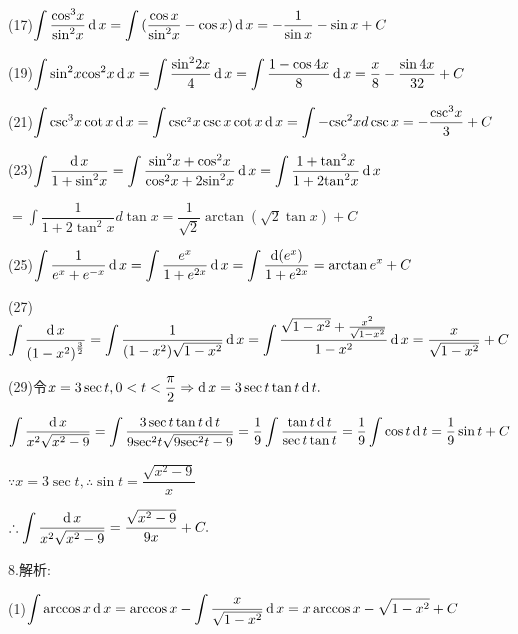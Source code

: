 (17)$\displaystyle\int {\dfrac{{{{\cos }^3}x}}{{{{\sin }^2}x}}} \operatorname{\mathop{}\!\mathrm{d}} x = \displaystyle\int {(\dfrac{{\cos x}}{{{{\sin }^2}x}} - \cos x)\operatorname{\mathop{}\!\mathrm{d}}x =  - \dfrac{1}{{\sin x}} - \sin x + C} $

(19)$\displaystyle\int {{{\sin }^2}x} {\cos ^2}x\operatorname{\mathop{}\!\mathrm{d}} x = \displaystyle\int {\dfrac{{{{\sin }^2}2x}}{4}} \operatorname{\mathop{}\!\mathrm{d}} x = \displaystyle\int {\dfrac{{1 - \cos 4x}}{8}} \operatorname{\mathop{}\!\mathrm{d}} x = \dfrac{x}{8} - \dfrac{{\sin 4x}}{{32}} + C$

(21)$\displaystyle\int {{{\csc }^3}x} \cot x\operatorname{\mathop{}\!\mathrm{d}} x = \displaystyle\int {{{\csc }^{_2}}x} \csc x\cot x\operatorname{\mathop{}\!\mathrm{d}} x = \displaystyle\int { - {{\csc }^2}x} d\csc x =  - \frac{{{{\csc }^3}x}}{3} + C$

(23)$\displaystyle\int {\dfrac{{\operatorname{\mathop{}\!\mathrm{d}}x}}{{1 + {{\sin }^2}x}}} = \displaystyle\int {\dfrac{{{{\sin }^2}x + {{\cos }^2}x}}{{{{\cos }^2}x + 2{{\sin }^2}x}}} \operatorname{\mathop{}\!\mathrm{d}} x = \displaystyle\int {\dfrac{{1 + {{\tan }^2}x}}{{1 + 2{{\tan }^2}x}}} \operatorname{\mathop{}\!\mathrm{d}} x$

$= \displaystyle\int {\dfrac{1}{{1 + 2{{\tan }^2}x}}} d\tan x = \dfrac{1}{{\sqrt 2 }}\arctan (\sqrt 2 \tan x) + C$

(25)$\displaystyle\int {\dfrac{1}{{{e^x} + {e^{ - x}}}}} \operatorname{\mathop{}\!\mathrm{d}} x = \displaystyle\int {\dfrac{{{e^x}}}{{1 + {e^{2x}}}}} \operatorname{\mathop{}\!\mathrm{d}} x = \displaystyle\int {\dfrac{{\operatorname{\mathop{}\!\mathrm{d}}({e^x})}}{{1 + {e^{2x}}}}}  = \arctan {e^x} + C$

(27)$\displaystyle\int {\dfrac{{\operatorname{\mathop{}\!\mathrm{d}}x}}{{{{(1 - {x^2})}^{\frac{3}{2}}}}}}  = \displaystyle\int {\dfrac{1}{{(1 - {x^2})\sqrt {1 - {x^2}} }}} \operatorname{\mathop{}\!\mathrm{d}} x = \displaystyle\int {\dfrac{{\sqrt {1 - {x^2}}  + \frac{{{x^2}}}{{\sqrt {1 - {x^2}} }}}}{{1 - {x^2}}}} \operatorname{\mathop{}\!\mathrm{d}} x = \dfrac{x}{{\sqrt {1 - {x^2}} }} + C$

(29)令$x = 3\sec t,0 < t < \dfrac{\pi }{2} \Rightarrow \operatorname{\mathop{}\!\mathrm{d}} x = 3\sec t\tan t\operatorname{\mathop{}\!\mathrm{d}} t.$

$\displaystyle\int {\dfrac{{\operatorname{\mathop{}\!\mathrm{d}}x}}{{{x^2}\sqrt {{x^2} - 9} }}}  = \displaystyle\int {\dfrac{{3\sec t\tan t\operatorname{\mathop{}\!\mathrm{d}}t}}{{9{{\sec }^2}t\sqrt {9{{\sec }^2}t - 9} }}}  = \dfrac{1}{9}\displaystyle\int {\dfrac{{\tan t\operatorname{\mathop{}\!\mathrm{d}}t}}{{\sec t\tan t}}}  = \dfrac{1}{9}\displaystyle\int {\cos t\operatorname{\mathop{}\!\mathrm{d}}t}  = \dfrac{1}{9}\sin t + C$

$\because x = 3\sec t,\therefore \sin t = \dfrac{{\sqrt {{x^2} - 9} }}{x}$

$\therefore \displaystyle\int {\dfrac{{\operatorname{\mathop{}\!\mathrm{d}}x}}{{{x^2}\sqrt {{x^2} - 9} }}}  = \dfrac{{\sqrt {{x^2} - 9} }}{{9x}} + C.$

8.解析:

(1)$\displaystyle\int {\arccos x\operatorname{\mathop{}\!\mathrm{d}}x = \arccos x - \displaystyle\int {\dfrac{x}{{\sqrt {1 - {x^2}} }}} } \operatorname{\mathop{}\!\mathrm{d}} x = x\arccos x - \sqrt {1 - {x^2}}  + C$

